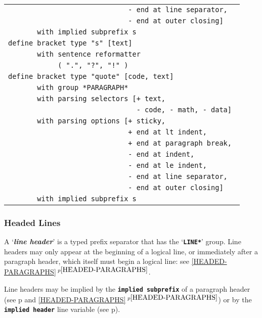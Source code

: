 \documentclass[12pt]{article}
\newcommand{\TT}[1]{{\tt \bfseries #1}}
\newcommand{\key}[1]{{\bf \em #1}\index{#1}}
\newcommand{\itemref}[1]{\ref{#1}$\,^{p\pageref{#1}}$}
\newcommand{\pagref}[1]{p\pageref{#1}}
\begin{document}
\begin{center}
\begin{tabular}{l}
\tt ~~~~~~~~~~~~~~~~~~~~~~~~~~~~~- end at line separator, \\
\tt ~~~~~~~~~~~~~~~~~~~~~~~~~~~~~- end at outer closing] \\
\tt ~~~~~~~with implied subprefix {s} \\
\tt define bracket type "s" [text] \\
\tt ~~~~~~~with sentence reformatter \\
\tt ~~~~~~~~~~~~( ".", "?", "!" ) \\
\tt define bracket type "quote" [code, text] \\
\tt ~~~~~~~with group *PARAGRAPH* \\
\tt ~~~~~~~with parsing selectors [+ text, \\
\tt ~~~~~~~~~~~~~~~~~~~~~~~~~~~~~~~- code, - math, - data] \\
\tt ~~~~~~~with parsing options [+ sticky, \\
\tt ~~~~~~~~~~~~~~~~~~~~~~~~~~~~~+ end at lt indent, \\
\tt ~~~~~~~~~~~~~~~~~~~~~~~~~~~~~+ end at paragraph break, \\
\tt ~~~~~~~~~~~~~~~~~~~~~~~~~~~~~- end at indent, \\
\tt ~~~~~~~~~~~~~~~~~~~~~~~~~~~~~- end at le indent, \\
\tt ~~~~~~~~~~~~~~~~~~~~~~~~~~~~~- end at line separator, \\
\tt ~~~~~~~~~~~~~~~~~~~~~~~~~~~~~- end at outer closing] \\
\tt ~~~~~~~with implied subprefix {s} \\
\end{tabular}

\end{center}


\subsubsection{Headed Lines}
\label{HEADED-LINES}

A `\key{line header}' is a typed prefix separator that has
the `\TT{*LINE*}' group.  Line headers may only
appear at the beginning of a logical line, or immediately
after a paragraph header, which itself must begin a logical
line: see \itemref{HEADED-PARAGRAPHS}.

Line headers may be implied by the \TT{implied subprefix}
of a paragraph header (see \pagref{IMPLIED-SUBPREFIX}
and \itemref{HEADED-PARAGRAPHS})
or by the \TT{implied header} line variable (see \pagref{IMPLIED-HEADER}).
\end{document}
